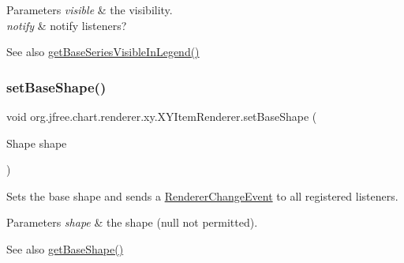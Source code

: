 \begin{DoxyParams}{Parameters}
{\em visible} & the visibility. \\
\hline
{\em notify} & notify listeners?\\
\hline
\end{DoxyParams}
\begin{DoxySeeAlso}{See also}
\mbox{\hyperlink{interfaceorg_1_1jfree_1_1chart_1_1renderer_1_1xy_1_1_x_y_item_renderer_ac39942d497bba9355b4b1e597028ce1a}{get\+Base\+Series\+Visible\+In\+Legend()}} 
\end{DoxySeeAlso}
\mbox{\label{interfaceorg_1_1jfree_1_1chart_1_1renderer_1_1xy_1_1_x_y_item_renderer_ae37032e410d9bb4b4349732c8c72dcb4}} 
\subsubsection{\texorpdfstring{set\+Base\+Shape()}{setBaseShape()}}
{\footnotesize\ttfamily void org.\+jfree.\+chart.\+renderer.\+xy.\+X\+Y\+Item\+Renderer.\+set\+Base\+Shape (\begin{DoxyParamCaption}\item[{Shape}]{shape }\end{DoxyParamCaption})}

Sets the base shape and sends a \mbox{\hyperlink{}{Renderer\+Change\+Event}} to all registered listeners.


\begin{DoxyParams}{Parameters}
{\em shape} & the shape ({\ttfamily null} not permitted).\\
\hline
\end{DoxyParams}
\begin{DoxySeeAlso}{See also}
\mbox{\hyperlink{interfaceorg_1_1jfree_1_1chart_1_1renderer_1_1xy_1_1_x_y_item_renderer_a3e28915be3dab2e9d8708ab6b92f9e5e}{get\+Base\+Shape()}} 
\end{DoxySeeAlso}
\mbox{\label{interfaceorg_1_1jfree_1_1chart_1_1renderer_1_1xy_1_1_x_y_item_renderer_ab49f6dd93d5b994aea58be71e1f8c9b9}} 
